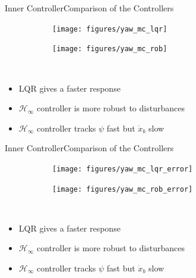 \begin{frame}{Inner Controller}{Comparison of the Controllers}
  \begin{figure}[H]
    \begin{minipage}{0.45\linewidth}
      \begin{figure}[H]
        \centering
        \texttt{[image: figures/yaw\_mc\_lqr]}
      \end{figure}        
    \end{minipage}\hfill      
    \begin{minipage}{0.45\linewidth}
      \begin{figure}[H]
        \centering
        \texttt{[image: figures/yaw\_mc\_rob]}
      \end{figure}                
    \end{minipage}\hfill \\
  \end{figure}
    \begin{itemize}
        \item LQR gives a faster response
        \item $\mathcal{H}_\infty$ controller is more robust to disturbances
        \item $\mathcal{H}_\infty$ controller tracks $\psi$ fast but $\dot{x}_b$ slow
    \end{itemize}
\end{frame}

\begin{frame}{Inner Controller}{Comparison of the Controllers}
  \begin{figure}[H]
    \begin{minipage}{0.45\linewidth}
      \begin{figure}[H]
        \centering
        \texttt{[image: figures/yaw\_mc\_lqr\_error]}
      \end{figure}        
    \end{minipage}\hfill      
    \begin{minipage}{0.45\linewidth}
      \begin{figure}[H]
        \centering
        \texttt{[image: figures/yaw\_mc\_rob\_error]}
      \end{figure}                
    \end{minipage}\hfill \\
  \end{figure}
    \begin{itemize}
      \item LQR gives a faster response
      \item $\mathcal{H}_\infty$ controller is more robust to disturbances
      \item $\mathcal{H}_\infty$ controller tracks $\psi$ fast but $\dot{x}_b$ slow
    \end{itemize}
\end{frame}

